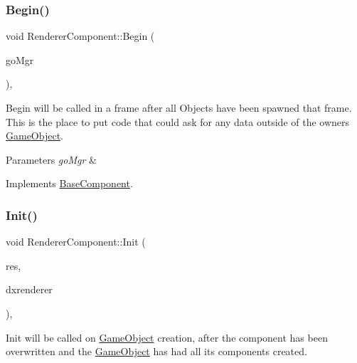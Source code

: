 \subsubsection{\texorpdfstring{Begin()}{Begin()}}
{\footnotesize\ttfamily void Renderer\+Component\+::\+Begin (\begin{DoxyParamCaption}\item[{\hyperlink{classGameObjectManager}{Game\+Object\+Manager} $\ast$}]{go\+Mgr }\end{DoxyParamCaption})\hspace{0.3cm}{\ttfamily [override]}, {\ttfamily [virtual]}}



Begin will be called in a frame after all Objects have been spawned that frame. This is the place to put code that could ask for any data outside of the owner\textquotesingle{}s \hyperlink{classGameObject}{Game\+Object}. 


\begin{DoxyParams}{Parameters}
{\em go\+Mgr} & \\
\hline
\end{DoxyParams}


Implements \hyperlink{classBaseComponent}{Base\+Component}.

\mbox{\label{classRendererComponent_aa6ae449d8ab701dc0eb20d1a8879765f}} 
\subsubsection{\texorpdfstring{Init()}{Init()}}
{\footnotesize\ttfamily void Renderer\+Component\+::\+Init (\begin{DoxyParamCaption}\item[{\hyperlink{classResourceManager}{Resource\+Manager} $\ast$}]{res,  }\item[{\hyperlink{classDXRenderer}{D\+X\+Renderer} $\ast$}]{dxrenderer }\end{DoxyParamCaption})\hspace{0.3cm}{\ttfamily [override]}, {\ttfamily [virtual]}}



Init will be called on \hyperlink{classGameObject}{Game\+Object} creation, after the component has been overwritten and the \hyperlink{classGameObject}{Game\+Object} has had all its components created. 


